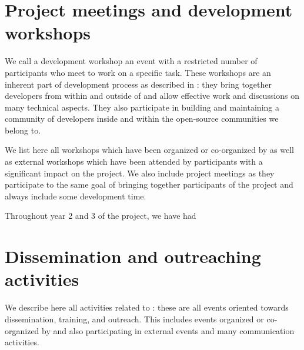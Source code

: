 \documentclass{deliverablereport}
\author{Viviane Pons et al.}
\begin{document}
\enlargethispage{4ex}
\maketitle
\githubissuedescription
\tableofcontents
\newpage


\section{Project meetings and development workshops}

We call a development workshop an event with a restricted number of participants
who meet to work on a specific task. These workshops are an inherent part
of \ODK development process as described in :
 they bring together
developers from within and outside of \ODK and allow effective work
and discussions on many technical aspects. They also participate in building
and maintaining a community of developers inside \ODK and within the
open-source communities we belong to.

We list here all workshops which have been organized or co-organized by \ODK
as well as external workshops which have been attended by \ODK participants
with a significant impact on the project. We also include project meetings as they
participate to the same goal of bringing together participants of the project and
always include some development time.

Throughout year 2 and 3 of the project, we have had












\section{Dissemination and outreaching activities}

We describe here all activities related to :
these are all events oriented towards dissemination, training, and outreach. This
includes events organized or co-organized by \ODK and also
participating in external events and many communication activities.
\end{document}
